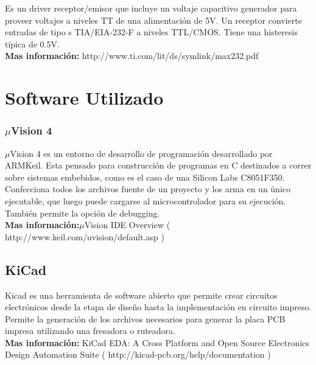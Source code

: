 \documentclass{article}
\theoremstyle{definition}
\theoremstyle{remark}
\begin{document}
Es un driver receptor/emisor que incluye un voltaje capacitivo generador para proveer voltajes a niveles TT de una alimentación de 5V. Un receptor convierte entradas de tipo s TIA/EIA-232-F a niveles TTL/CMOS. Tiene una histeresis típica de 0.5V. \\


\textbf{Mas información:} http://www.ti.com/lit/ds/symlink/max232.pdf







\section{Software Utilizado} %
\label{sec:sofware_utilizado}


\subsubsection{$\mu$Vision 4} %
\label{ssub:uvision_4}

$\mu$Vision 4 es un entorno de desarrollo de programación desarrollado por ARMKeil. Esta pensado para construcción de programas en C destinados a correr sobre sistemas embebidos, como es el caso de una Silicon Labs C8051F350. Confecciona todos los archivos fuente de un proyecto y los arma en un único ejecutable, que luego puede cargarse al microcontrolador para su ejecución. También permite la opción de debugging. \\

\textbf{Mas información:}$\mu$Vision IDE Overview ( http://www.keil.com/uvision/default.asp )



\subsection{KiCad} %
\label{sub:kicad}

Kicad es una herramienta de software abierto que permite crear circuitos electrónicos desde la etapa de diseño hasta la implementación en circuito impreso. Permite la generación de los archivos necesarios para generar la placa PCB impresa utilizando una fresadora o ruteadora.  \\


\textbf{Mas información:} KiCad EDA: A Cross Platform and Open Source Electronics Design Automation Suite ( http://kicad-pcb.org/help/documentation )
\end{document}
